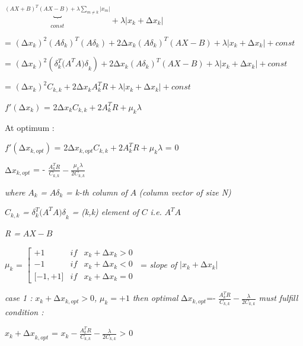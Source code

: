 \(\underset{const}{\overset{(AX + B)^{T}(AX - B) + \lambda\sum_{m \neq k}^{}\left| x_{m} \right|}{︸}} + \lambda\left| x_{k} + {\mathrm{\Delta}x}_{k} \right|\)

=
\(\left( {\mathrm{\Delta}x}_{k} \right)^{2}\left( {A\delta}_{k} \right)^{T}\left( {A\delta}_{k} \right) + {2\mathrm{\Delta}x}_{k}\left( {A\delta}_{k} \right)^{T}(AX - B) + \lambda\left| x_{k} + {\mathrm{\Delta}x}_{k} \right| + const\)

=
\(\left( {\mathrm{\Delta}x}_{k} \right)^{2}(\delta_{k}^{T}{(A}^{T}{A)\delta}_{k}) + {2\mathrm{\Delta}x}_{k}\left( {A\delta}_{k} \right)^{T}(AX - B) + \lambda\left| x_{k} + {\mathrm{\Delta}x}_{k} \right| + const\)

=
\(\left( {\mathrm{\Delta}x}_{k} \right)^{2}C_{k,k} + {2\mathrm{\Delta}x}_{k}A_{k}^{T}R + \lambda\left| x_{k} + {\mathrm{\Delta}x}_{k} \right| + const\)

\(f'\left( {\mathrm{\Delta}x}_{k} \right)\) =
2\({\mathrm{\Delta}x}_{k}C_{k,k} + 2A_{k}^{T}R + \mu_{k}\lambda\)

At optimum :

\(f'\left( {\mathrm{\Delta}x}_{k,opt} \right)\) =
2\({\mathrm{\Delta}x}_{k,opt}C_{k,k} + 2A_{k}^{T}R + \mu_{k}\lambda\) =
0

\({\mathrm{\Delta}x}_{k,opt}\) = -
\(\frac{A_{k}^{T}R}{C_{k,k}} - \frac{\mu_{k}\lambda}{{2C}_{k,k}}\)

\emph{where} \(A_{k}\) \emph{=} \({A\delta}_{k}\) \emph{= k-th column
of} \(A\) \emph{(column vector of size N)}

\(C_{k,k}\) \emph{=} \(\delta_{k}^{T}{(A}^{T}{A)\delta}_{k}\) \emph{=
(k,k) element of} \(C\) \emph{i.e.} \(A^{T}A\)

\emph{R =} \(AX - B\)

\(\mu_{k}\) = \(\left\lbrack \begin{matrix}
 + 1 & if & x_{k} + {\mathrm{\Delta}x}_{k} > 0 \\
 - 1 & if & x_{k} + {\mathrm{\Delta}x}_{k} < 0 \\
\lbrack - 1, + 1\rbrack & if & x_{k} + {\mathrm{\Delta}x}_{k} = 0
\end{matrix} \right.\ \) = \emph{slope of}
\(\left| x_{k} + {\mathrm{\Delta}x}_{k} \right|\)

\emph{case 1 :} \(x_{k} + {\mathrm{\Delta}x}_{k,opt} > 0\)\emph{,}
\(\mu_{k} = + 1\) \emph{then optimal} \({\mathrm{\Delta}x}_{k,opt}\)=-
\(\frac{A_{k}^{T}R}{C_{k,k}} - \frac{\lambda}{{2C}_{k,k}}\) \emph{must
fulfill condition :}

\({x_{k} + \mathrm{\Delta}x}_{k,opt}\) =
\(x_{k} - \frac{A_{k}^{T}R}{C_{k,k}} - \frac{\lambda}{2C_{k,k}}\)
\textgreater{} 0

